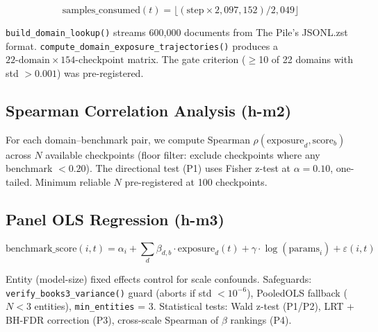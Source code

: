 \begin{equation}
\text{samples\_consumed}(t) = \lfloor (\text{step} \times 2{,}097{,}152) / 2{,}049 \rfloor
\end{equation}

\texttt{build\_domain\_lookup()} streams 600,000 documents from The Pile's JSONL.zst format. \texttt{compute\_domain\_exposure\_trajectories()} produces a $22\text{-domain} \times 154\text{-checkpoint}$ matrix. The gate criterion ($\geq$10 of 22 domains with std $> 0.001$) was pre-registered.

\subsection{Spearman Correlation Analysis (h-m2)}

For each domain--benchmark pair, we compute Spearman $\rho(\text{exposure}_d, \text{score}_b)$ across $N$ available checkpoints (floor filter: exclude checkpoints where any benchmark $< 0.20$). The directional test (P1) uses Fisher z-test at $\alpha = 0.10$, one-tailed. Minimum reliable $N$ pre-registered at 100 checkpoints.

\subsection{Panel OLS Regression (h-m3)}

\begin{equation}
\text{benchmark\_score}(i, t) = \alpha_i + \sum_d \beta_{d,b} \cdot \text{exposure}_d(t) + \gamma \cdot \log(\text{params}_i) + \varepsilon(i,t)
\end{equation}

Entity (model-size) fixed effects control for scale confounds. Safeguards: \texttt{verify\_books3\_variance()} guard (aborts if std $< 10^{-6}$), PooledOLS fallback ($N < 3$ entities), \texttt{min\_entities} = 3. Statistical tests: Wald z-test (P1/P2), LRT + BH-FDR correction (P3), cross-scale Spearman of $\beta$ rankings (P4).
